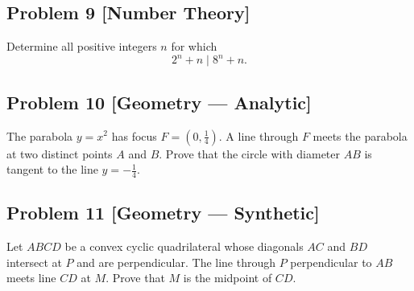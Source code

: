 \documentclass[11pt,a4paper]{article}
\newcommand{\problem}[3]{%
  \subsection*{Problem #1 \; \textnormal{\small[#2]}}\label{prob:#3}%
}
\begin{document}
\problem{9}{Number Theory}{number-theory}
Determine all positive integers $n$ for which
\[
  2^n+n\mid 8^n+n.
\]

\problem{10}{Geometry --- Analytic}{analytic-geometry}
The parabola $y=x^2$ has focus $F=(0,\tfrac14)$. A line through $F$ meets the parabola at two distinct points $A$ and $B$. Prove that the circle with diameter $AB$ is tangent to the line $y=-\tfrac14$.

\problem{11}{Geometry --- Synthetic}{synthetic-geometry}
Let $ABCD$ be a convex cyclic quadrilateral whose diagonals $AC$ and $BD$ intersect at $P$ and are perpendicular. The line through $P$ perpendicular to $AB$ meets line $CD$ at $M$. Prove that $M$ is the midpoint of $CD$.
\end{document}
